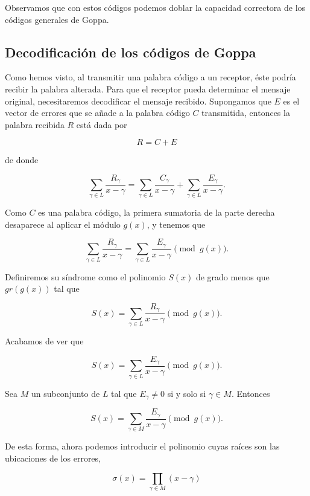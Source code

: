 Observamos que con estos códigos podemos doblar la capacidad correctora de los códigos generales de Goppa.


\subsection{Decodificación de los códigos de Goppa}

Como hemos visto, al transmitir una palabra código a un receptor, éste podría recibir la palabra alterada. Para que el receptor pueda determinar el mensaje original, necesitaremos decodificar el mensaje recibido. Supongamos que $E$ es el vector de errores que se añade a la palabra código $C$ transmitida, entonces la palabra recibida $R$ está dada por

$$R = C + E$$

de donde 

$$\sum_{\gamma \in L} \frac{R_\gamma}{x - \gamma} = \sum_{\gamma \in L} \frac{C_\gamma}{x - \gamma} + \sum_{\gamma \in L} \frac{E_\gamma}{x - \gamma}.$$

Como $C$ es una palabra código, la primera sumatoria de la parte derecha desaparece al aplicar el módulo $g(x)$, y tenemos que

$$\sum_{\gamma \in L} \frac{R_\gamma}{x - \gamma} = \sum_{\gamma \in L} \frac{E_\gamma}{x - \gamma} \pmod{g(x)}.$$

Definiremos su síndrome como el polinomio $S(x)$ de grado menos que $gr(g(x))$ tal que 

$$S(x) = \sum_{\gamma \in L} \frac{R_\gamma}{x - \gamma} \pmod{g(x)}.$$

Acabamos de ver que 

$$S(x) = \sum_{\gamma \in L} \frac{E_\gamma}{x - \gamma} \pmod{g(x)}.$$

Sea $M$ un subconjunto de $L$ tal que $E_{\gamma} \neq 0$ si y solo si $\gamma \in M$. Entonces

\begin{equation}
    \label{def:sindrome}
    S(x) = \sum_{\gamma \in M} \frac{E_\gamma}{x - \gamma} \pmod{g(x)}.
\end{equation}

De esta forma, ahora podemos introducir el polinomio cuyas raíces son las ubicaciones de los errores,

\begin{equation}
    \label{def:localizaciones}
    \sigma (x) = \prod_{\gamma \in M} (x - \gamma)
\end{equation}

